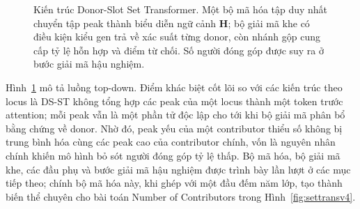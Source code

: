 \documentclass[12pt,a4paper]{article}
\begin{document}
\begin{figure}[H]
\centering
{}
\caption{Kiến trúc Donor-Slot Set Transformer. Một bộ mã hóa tập duy nhất chuyển tập peak thành biểu diễn ngữ cảnh \(\mathbf{H}\); bộ giải mã khe có điều kiện kiểu gen trả về xác suất từng donor, còn nhánh gộp cung cấp tỷ lệ hỗn hợp và điểm từ chối. Số người đóng góp được suy ra ở bước giải mã hậu nghiệm.}
\label{fig:overall}
\end{figure}

Hình~\ref{fig:overall} mô tả luồng top-down. Điểm khác biệt cốt lõi so với các kiến trúc theo locus là DS-ST không tổng hợp các peak của một locus thành một token trước attention; mỗi peak vẫn là một phần tử độc lập cho tới khi bộ giải mã phân bổ bằng chứng về donor. Nhờ đó, peak yếu của một contributor thiểu số không bị trung bình hóa cùng các peak cao của contributor chính, vốn là nguyên nhân chính khiến mô hình bỏ sót người đóng góp tỷ lệ thấp. Bộ mã hóa, bộ giải mã khe, các đầu phụ và bước giải mã hậu nghiệm được trình bày lần lượt ở các mục tiếp theo; chính bộ mã hóa này, khi ghép với một đầu đếm năm lớp, tạo thành biến thể chuyên cho bài toán Number of Contributors trong Hình~\ref{fig:settransv4}.
\end{document}
